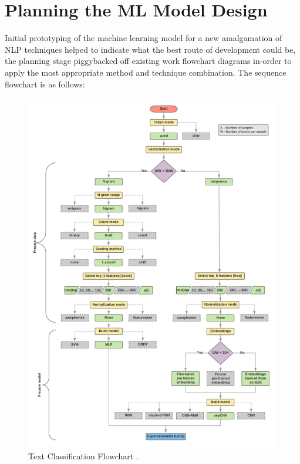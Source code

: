 

\section{Planning the ML Model Design}

Initial prototyping of the machine learning model for a new amalgamation of NLP techniques helped to indicate what the best route of development could be, the planning stage piggybacked off existing work flowchart diagrams in-order to apply the most appropriate method and technique combination. The sequence flowchart is as follows:

\begin{figure}[H]
    \centering
    \includegraphics[width=\textwidth]{figures/chapter-5/GooglePlan.pdf}
    \caption[GooglePlan]{Text Classification Flowchart \parencite{google2021TCF}.
    \label{fig:GooglePlan}}
\end{figure}

